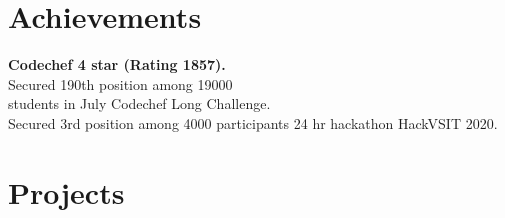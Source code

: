 \documentclass[]{deedy-resume-openfont}
\begin{document}
\begin{minipage}[t][0pt]{0.33\textwidth} 





\section{Achievements}

\textbullet{} \textbf {Codechef 4 star (Rating 1857).}\\
\textbullet{} Secured 190th position among 19000 \\students
in July Codechef Long Challenge.\\
\textbullet{} Secured 3rd position among 4000 participants 24 hr
hackathon HackVSIT 2020.
\sectionsep






\section{Projects}


 \hspace*{\fill}
\href{https://ripen.in}{\faLink}
\descript{}
\location{}


\end{minipage}
\end{document}

